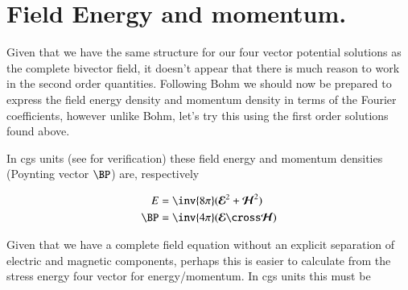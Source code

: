 \documentclass{article}
\newcommand{\EE}[0]{\boldsymbol{\mathcal{E}}}
\newcommand{\HH}[0]{\boldsymbol{\mathcal{H}}}
\begin{document}
%
%
%
%
%
%
%

\section{ Field Energy and momentum. }

Given that we have the same structure for our four vector potential solutions as the complete bivector field, it doesn't appear that there is much
reason to work in the second order quantities.  Following Bohm we should now be prepared to express the field energy density and
momentum density in terms of the Fourier coefficients, however unlike Bohm, let's try this using the first order 
solutions found above.

In cgs units (see \cite{PJrayleighJeans} for verification) these field energy and momentum densities (Poynting vector $\BP$) are, respectively

\begin{align*}
E &= \inv{8\pi} ({\EE}^2 + \HH^2) \\
\BP &= \inv{4\pi} (\EE \cross \HH )
\end{align*}

Given that we have a complete field equation without an explicit separation of electric and magnetic components, perhaps this
is easier to calculate from the stress energy four vector for energy/momentum.  In cgs units this must be
\end{document}

